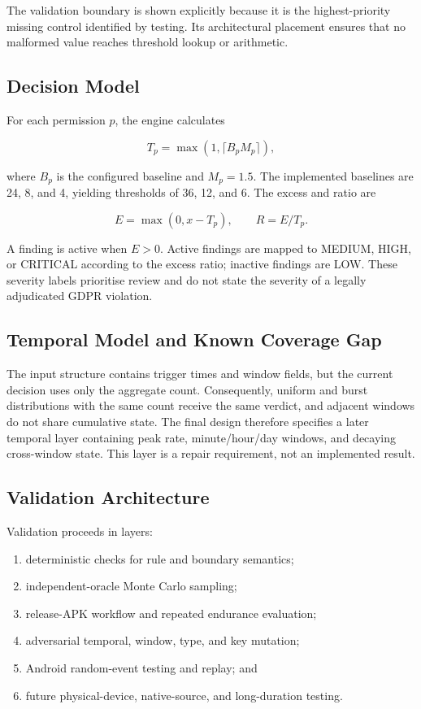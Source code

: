 The validation boundary is shown explicitly because it is the highest-priority missing control identified by testing. Its architectural placement ensures that no malformed value reaches threshold lookup or arithmetic.

\subsection{Decision Model}

For each permission $p$, the engine calculates

\begin{equation}
T_p=\max(1,\lceil B_pM_p\rceil),
\end{equation}

where $B_p$ is the configured baseline and $M_p=1.5$. The implemented baselines are 24, 8, and 4, yielding thresholds of 36, 12, and 6. The excess and ratio are

\begin{equation}
E=\max(0,x-T_p),\qquad R=E/T_p.
\end{equation}

A finding is active when $E>0$. Active findings are mapped to MEDIUM, HIGH, or CRITICAL according to the excess ratio; inactive findings are LOW. These severity labels prioritise review and do not state the severity of a legally adjudicated GDPR violation.

\subsection{Temporal Model and Known Coverage Gap}

The input structure contains trigger times and window fields, but the current decision uses only the aggregate count. Consequently, uniform and burst distributions with the same count receive the same verdict, and adjacent windows do not share cumulative state. The final design therefore specifies a later temporal layer containing peak rate, minute/hour/day windows, and decaying cross-window state. This layer is a repair requirement, not an implemented result.

\subsection{Validation Architecture}

Validation proceeds in layers:

\begin{enumerate}
    \item deterministic checks for rule and boundary semantics;
    \item independent-oracle Monte Carlo sampling;
    \item release-APK workflow and repeated endurance evaluation;
    \item adversarial temporal, window, type, and key mutation;
    \item Android random-event testing and replay; and
    \item future physical-device, native-source, and long-duration testing.
\end{enumerate}

